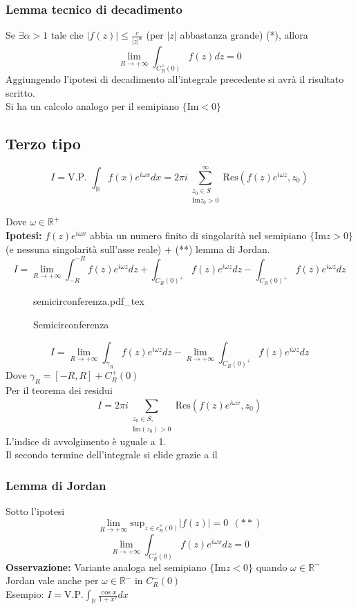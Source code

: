 \documentclass[a4paper]{article}
\newcommand{\incfig}[1]{%
	\def\svgwidth{\columnwidth}
	{#1.pdf_tex}
}
\newcommand{\R}{\mathbb{R}}
\begin{document}
\subsubsection{Lemma tecnico di decadimento}
Se $\exists \alpha >1$ tale che $|f(z)|\le \frac{c}{|z|^\alpha}$ (per $|z|$ abbastanza grande) (*), allora
\[\lim_{R \to +\infty} \int_{C_R^+(0)}^{} f(z)dz=0\]
Aggiungendo l'ipotesi di decadimento all'integrale precedente si avrà il risultato scritto.
\\Si ha un calcolo analogo per il semipiano $\{\text{Im}<0\} $
\subsection{Terzo tipo}
\begin{tcolorbox}	
	\[I=\text{V.P.  }\int_{\R}^{} f(x)e^{i\omega x}dx=2 \pi i \sum_{\substack{z_0\in S\\\text{Im}z_0>0}}^{\infty} \text{Res}(f(z)e^{i\omega z},z_0)\] 
\end{tcolorbox}
Dove $\omega \in \R^+$
\\\textbf{Ipotesi: }$f(z)e^{i\omega x}$ abbia un numero finito di singolarità nel semipiano $\{\text{Im}z>0\} $ (e nessuna singolarità sull'asse reale) + (**) lemma di Jordan.
\[I=\lim_{R \to +\infty} \int_{-R}^{-R} f(z)e^{i\omega z}dz+\int_{C_R(0)^+}^{} f(z)e^{i\omega z}dz-\int_{C_R(0)^+}^{} f(z)e^{i\omega z}dz \]
\begin{figure}[ht]
    \centering
    \incfig{semicirconferenza}
    \caption{Semicirconferenza}
    \label{fig:semicirconferenza}
\end{figure}
\[I=\lim_{R \to +\infty} \int_{\gamma_R}{f(z)e^{i\omega z}dz} -\lim_{R \to +\infty} \int_{C_R(0)^+}^{} f(z)e^{i\omega z}dz\]
Dove $\gamma_R=[-R,R]+C_R^+(0)$
\\Per il teorema dei residui
\[I=2\pi i \sum_{\substack{z_0\in S,\\  \text{Im}(z_0)>0}}^{} \text{Res}(f(z)e^{i\omega x},z_0)\]
L'indice di avvolgimento è uguale a 1.\\
Il secondo termine dell'integrale si elide grazie a il 
\subsubsection{Lemma di Jordan}
Sotto l'ipotesi 
\[\lim_{R \to +\infty}\text{sup}_{z\in c_R^+(0)}|f(z)|=0  \ \ (**)\]
\[\lim_{R \to +\infty} \int_{C_R^+(0)}^{} f(z)e^{i\omega x}dz=0\] 
\textbf{Osservazione:} Variante analoga nel semipiano $\{\text{Im}z<0\} $ quando $\omega \in \R^-$
\\Jordan vale anche per $\omega \in \R^-$ in $C_R^-(0)$
\\Esempio: $I= \text{V.P.}\int_{\R}^{} \frac{\cos x}{1+x^2}dx$
\end{document}

